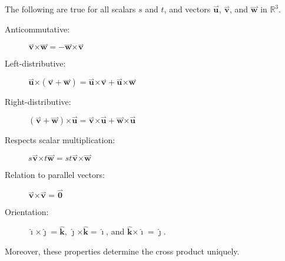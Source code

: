 \documentclass{ximera}
\begin{document}
\begin{theorem}
  The following are true for all scalars $s$ and $t$, and vectors
  $\overset{\boldsymbol{\rightharpoonup}}{\mathbf{u}}$, $\overset{\boldsymbol{\rightharpoonup}}{\mathbf{v}}$, and $\overset{\boldsymbol{\rightharpoonup}}{\mathbf{w}}$ in $\mathbb{R}^3$.
  \begin{description}
  \item[Anticommutative:] $\overset{\boldsymbol{\rightharpoonup}}{\mathbf{v}} \boldsymbol\times \overset{\boldsymbol{\rightharpoonup}}{\mathbf{w}}  = -\overset{\boldsymbol{\rightharpoonup}}{\mathbf{w}} \boldsymbol\times \overset{\boldsymbol{\rightharpoonup}}{\mathbf{v}}$
  \item[Left-distributive:] $\overset{\boldsymbol{\rightharpoonup}}{\mathbf{u}} \boldsymbol\times (\overset{\boldsymbol{\rightharpoonup}}{\mathbf{v}} +\overset{\boldsymbol{\rightharpoonup}}{\mathbf{w}}) = \overset{\boldsymbol{\rightharpoonup}}{\mathbf{u}} \boldsymbol\times \overset{\boldsymbol{\rightharpoonup}}{\mathbf{v}}+\overset{\boldsymbol{\rightharpoonup}}{\mathbf{u}} \boldsymbol\times\overset{\boldsymbol{\rightharpoonup}}{\mathbf{w}}$
  \item[Right-distributive:] $(\overset{\boldsymbol{\rightharpoonup}}{\mathbf{v}}+\overset{\boldsymbol{\rightharpoonup}}{\mathbf{w}}) \boldsymbol\times \overset{\boldsymbol{\rightharpoonup}}{\mathbf{u}} = \overset{\boldsymbol{\rightharpoonup}}{\mathbf{v}} \boldsymbol\times \overset{\boldsymbol{\rightharpoonup}}{\mathbf{u}}+\overset{\boldsymbol{\rightharpoonup}}{\mathbf{w}} \boldsymbol\times \overset{\boldsymbol{\rightharpoonup}}{\mathbf{u}}$
  \item[Respects scalar multiplication:] $s\overset{\boldsymbol{\rightharpoonup}}{\mathbf{v}} \boldsymbol\times t\overset{\boldsymbol{\rightharpoonup}}{\mathbf{w}} = st \overset{\boldsymbol{\rightharpoonup}}{\mathbf{v}} \boldsymbol\times \overset{\boldsymbol{\rightharpoonup}}{\mathbf{w}}$
  \item[Relation to parallel vectors:] $\overset{\boldsymbol{\rightharpoonup}}{\mathbf{v}} \boldsymbol\times \overset{\boldsymbol{\rightharpoonup}}{\mathbf{v}} = \overset{\boldsymbol{\rightharpoonup}}{\mathbf{0}}$
  \item[Orientation:] $\boldsymbol{\hat{\imath}} \boldsymbol\times \boldsymbol{\hat{\jmath}} = \boldsymbol{\hat{k}}$, $\boldsymbol{\hat{\jmath}} \boldsymbol\times \boldsymbol{\hat{k}} = \boldsymbol{\hat{\imath}}$, and $\boldsymbol{\hat{k}} \boldsymbol\times \boldsymbol{\hat{\imath}} = \boldsymbol{\hat{\jmath}}$.
  \end{description}
  Moreover, these properties determine the cross product uniquely.
\end{theorem}
\end{document}
